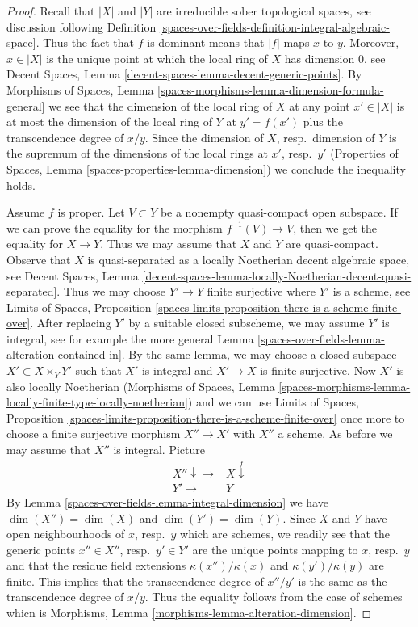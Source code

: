 \begin{proof}
Recall that $|X|$ and $|Y|$ are irreducible sober topological spaces, see
discussion following Definition \ref{spaces-over-fields-definition-integral-algebraic-space}.
Thus the fact that $f$ is dominant means that $|f|$ maps $x$ to $y$.
Moreover, $x \in |X|$ is the unique point at which the
local ring of $X$ has dimension $0$, see
Decent Spaces, Lemma \ref{decent-spaces-lemma-decent-generic-points}.
By Morphisms of Spaces, Lemma
\ref{spaces-morphisms-lemma-dimension-formula-general}
we see that the dimension of the local ring of $X$ at
any point $x' \in |X|$ is at most the dimension of the local
ring of $Y$ at $y' = f(x')$ plus the transcendence degree of $x/y$.
Since the dimension of $X$, resp.\ dimension of $Y$ is the
supremum of the dimensions of the local rings at $x'$, resp.\ $y'$
(Properties of Spaces, Lemma \ref{spaces-properties-lemma-dimension})
we conclude the inequality holds.

\medskip\noindent
Assume $f$ is proper.
Let $V \subset Y$ be a nonempty quasi-compact open subspace.
If we can prove the equality for the morphism $f^{-1}(V) \to V$,
then we get the equality for $X \to Y$. Thus we may assume that
$X$ and $Y$ are quasi-compact.
Observe that $X$ is quasi-separated as
a locally Noetherian decent algebraic space, see
Decent Spaces, Lemma
\ref{decent-spaces-lemma-locally-Noetherian-decent-quasi-separated}.
Thus we may choose $Y' \to Y$ finite surjective where $Y'$
is a scheme, see Limits of Spaces, Proposition
\ref{spaces-limits-proposition-there-is-a-scheme-finite-over}.
After replacing $Y'$ by a suitable closed subscheme, we
may assume $Y'$ is integral, see for example the more general
Lemma \ref{spaces-over-fields-lemma-alteration-contained-in}.
By the same lemma, we may choose a closed subspace
$X' \subset X \times_Y Y'$ such that $X'$ is integral
and $X' \to X$ is finite surjective.
Now $X'$ is also locally Noetherian
(Morphisms of Spaces, Lemma
\ref{spaces-morphisms-lemma-locally-finite-type-locally-noetherian})
and we can use Limits of Spaces, Proposition
\ref{spaces-limits-proposition-there-is-a-scheme-finite-over}
once more to choose a finite surjective morphism $X'' \to X'$
with $X''$ a scheme. As before we may assume that $X''$
is integral. Picture
$$
\begin{array}{cc}X'' \downarrow\longrightarrow & X \overset{f}{\downarrow} \\ Y' \longrightarrow & Y\end{array}
$$
By Lemma \ref{spaces-over-fields-lemma-integral-dimension} we have $\dim(X'') = \dim(X)$
and $\dim(Y') = \dim(Y)$. Since $X$ and $Y$ have open neighbourhoods
of $x$, resp.\ $y$ which are schemes, we readily see that the generic
points $x'' \in X''$, resp.\ $y' \in Y'$ are the unique points mapping
to $x$, resp.\ $y$ and that the residue field extensions
$\kappa(x'')/\kappa(x)$ and $\kappa(y')/\kappa(y)$ are finite.
This implies that the transcendence degree of $x''/y'$ is the
same as the transcendence degree of $x/y$. Thus the equality follows
from the case of schemes whicn is
Morphisms, Lemma \ref{morphisms-lemma-alteration-dimension}.
\end{proof}

